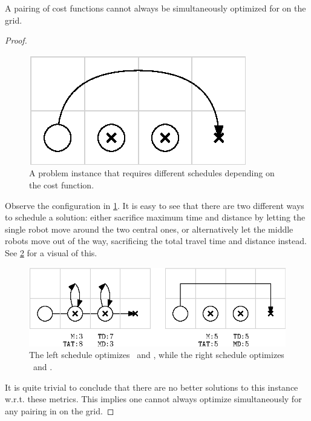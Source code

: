\begin{lemma}\label{lemma:simultaneous_1}
	A pairing of cost functions  cannot always be simultaneously optimized for on the grid. 
\end{lemma}

\begin{proof}

	\begin{figure}[h]
		\centering
		\includegraphics[width=0.35\linewidth]{ipe/sim1_problem.eps}
		\caption{
			A problem instance that requires different schedules depending on the cost function.
		}
		\label{fig:sim1}
	\end{figure}

	Observe the configuration in \cref{fig:sim1}.  It is easy to see that there are two different ways to schedule a solution: either sacrifice maximum time and distance by letting the single robot move around the two central ones, or alternatively let the middle robots move out of the way, sacrificing the total travel time and distance instead. See \cref{fig:sim1_strat} for a visual of this. 

	\begin{figure}[h]
		\centering
		\includegraphics[width=0.7\linewidth]{ipe/sim1_strat.eps}
		\caption{
			The left schedule optimizes \ and , while the right schedule optimizes \ and .
		}
		\label{fig:sim1_strat}
	\end{figure}

It is quite trivial to conclude that there are no better solutions to this instance w.r.t. these metrics. This implies one cannot always optimize simultaneously for any pairing in  on the grid.
\end{proof}

